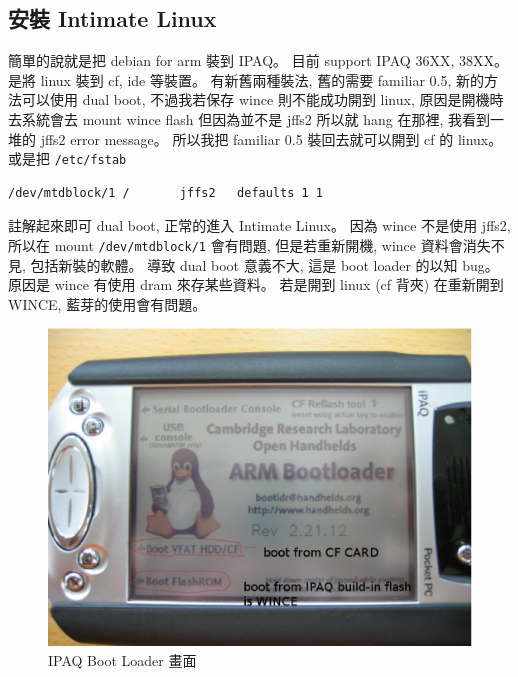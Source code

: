 \documentclass[12pt,a4paper]{article}
\begin{document}
\begin{CJK}{UTF8}{cwmu}
\section{安裝 Intimate Linux}\label{intimate}
簡單的說就是把 debian for arm 裝到 IPAQ。
目前 support IPAQ 36XX, 38XX。
是將 linux 裝到 cf, ide 等裝置。
有新舊兩種裝法, 舊的需要 familiar 0.5,
新的方法可以使用 dual boot,
不過我若保存 wince 則不能成功開到 linux,
原因是開機時去系統會去 mount wince flash 但因為並不是 jffs2 所以就 hang 在那裡,
我看到一堆的 jffs2 error message。
所以我把 familiar 0.5 裝回去就可以開到 cf 的 linux。
或是把 \verb+/etc/fstab+
\begin{verbatim}
/dev/mtdblock/1 /       jffs2   defaults 1 1
\end{verbatim}
註解起來即可 dual boot, 正常的進入 Intimate Linux。
因為 wince 不是使用 jffs2, 所以在 mount \verb+/dev/mtdblock/1+
會有問題, 但是若重新開機, wince 資料會消失不見, 包括新裝的軟體。
導致 dual boot 意義不大, 這是 boot loader 的以知 bug。
原因是 wince 有使用 dram 來存某些資料。
若是開到 linux (cf 背夾) 在重新開到 WINCE,
藍芽的使用會有問題。


\begin{figure}[htbp]
\centering
\includegraphics[scale=0.5]{eps/bootloader.eps}
\caption{IPAQ Boot Loader 畫面}
\end{figure}


\end{CJK}
\end{document}

